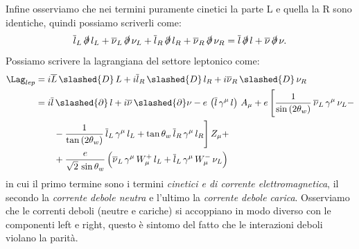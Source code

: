 Infine osserviamo che nei termini puramente cinetici la parte L e quella la R sono identiche, quindi possiamo scriverli come:
\begin{equation}
    \overline{l}_L\, \slashed{\partial}\, l_L + \overline{\nu}_L\, \slashed{\partial}\, \nu_L + \overline{l}_R\, \slashed{\partial}\, l_R + \overline{\nu}_R\, \slashed{\partial}\, \nu_R = \overline{l}\, \slashed{\partial}\, l + \overline{\nu}\, \slashed{\partial}\, \nu.
\end{equation}
Possiamo scrivere la lagrangiana del settore leptonico come:
\begin{align}
    \Lag_{lep} &= i\overline{L}\, \slashed{D}\, L + i\overline{l}_R\, \slashed{D}\, l_R + i\overline{\nu}_R\, \slashed{D}\, \nu_R \\
    &= i\overline{l}\, \slashed{\partial}\, l + i\overline{\nu}\, \slashed{\partial}\nu - e\, \left(\overline{l}\, \gamma^\mu\, l\right)\, A_\mu + e\, \Bigg[ \frac{1}{\sin{(2\theta_w)}}\, \overline{\nu}_L\, \gamma^\mu\, \nu_L - \notag \\
    &\qquad - \frac{1}{\tan{(2\theta_w)}}\, \overline{l}_L\, \gamma^\mu\, l_L + \tan\theta_w\, \overline{l}_R\, \gamma^\mu\, l_R \Bigg]\, Z_\mu + \notag \\
    &\qquad + \frac{e}{\sqrt{2}\, \sin\theta_w}\, \Big( \overline{\nu}_L\, \gamma^\mu\, W_\mu^+\, l_L + \overline{l}_L\, \gamma^\mu\, W_\mu^-\, \nu_L \Big)
\end{align}
in cui il primo termine sono i termini \textit{cinetici e di corrente elettromagnetica}, il secondo la \textit{corrente debole neutra} e l'ultimo la \textit{corrente debole carica}. Osserviamo che le correnti deboli (neutre e cariche) si accoppiano in modo diverso con le componenti left e right, questo è sintomo del fatto che le interazioni deboli violano la parità. \\

